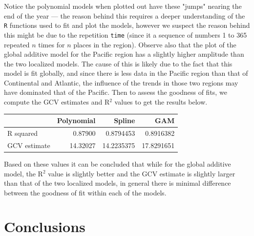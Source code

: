 \documentclass[aoas]{imsart}\usepackage[]{graphicx}\usepackage[]{xcolor}
\newenvironment{knitrout}{}{} %
\begin{document}
\noindent Notice the polynomial models when plotted out have these "jumps" nearing the end of the year --- the reason behind this requires a deeper understanding of the \texttt{R} functions used to fit and plot the models, however we suspect the reason behind this might be due to the repetition \texttt{time} (since it a sequence of numbers 1 to 365 repeated $n$ times for $n$ places in the region). Observe also that the plot of the global additive model for the Pacific region has a slightly higher amplitude than the two localized models. The cause of this is likely due to the fact that this model is fit globally, and since there is less data in the Pacific region than that of Continental and Atlantic, the influence of the trends in those two regions may have dominated that of the Pacific. Then to assess the goodness of fits, we compute the GCV estimates and R$^2$ values to get the results below.
\begin{knitrout}
\color{fgcolor}\begin{table}[!h]
\centering\begingroup\fontsize{11}{13}\selectfont

\begin{tabular}[t]{lrrr}
\toprule
  & Polynomial & Spline & GAM\\
\midrule
R squared & 0.87900 & 0.8794453 & 0.8916382\\
GCV estimate & 14.32027 & 14.2235375 & 17.8291651\\
\bottomrule
\end{tabular}
\endgroup{}
\end{table}

\end{knitrout}

Based on these values it can be concluded that while for the global additive model, the R$^2$ value is slightly better and the GCV estimate is slightly larger than that of the two localized models, in general there is minimal difference between the goodness of fit within each of the models.

\section{Conclusions}\hfill\\
\end{document}
